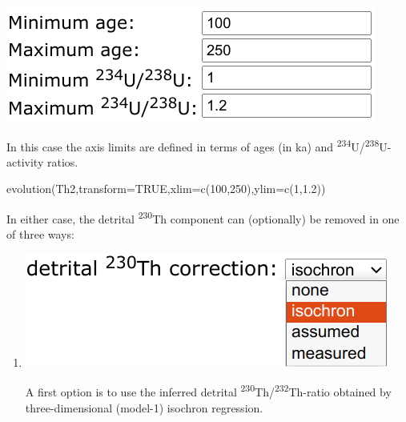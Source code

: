 \begin{refsection}
\begin{enumerate}
  \noindent\begin{minipage}[t]{.4\linewidth}
  \strut\vspace*{-\baselineskip}\newline
  \includegraphics[width=\linewidth]{../figures/ThUvsAgeLimits.png}
  \end{minipage}
  \begin{minipage}[t]{.6\linewidth}
    In this case the axis limits are defined in terms of ages (in ka)
    and \textsuperscript{234}U/\textsuperscript{238}U-activity ratios.
  \end{minipage}

\begin{console}
evolution(Th2,transform=TRUE,xlim=c(100,250),ylim=c(1,1.2))
\end{console}

  In either case, the detrital \textsuperscript{230}Th component can
  (optionally) be removed in one of three ways:

\begin{enumerate}
  \item \begin{minipage}[t]{.4\linewidth}
    \strut\vspace*{-\baselineskip}\newline
    \includegraphics[width=\linewidth]{../figures/ThUdetritalisochroncorr.png}
  \end{minipage}
    \begin{minipage}[t]{.6\linewidth}
      A first option is to use the inferred detrital
      \textsuperscript{230}Th/\textsuperscript{232}Th-ratio obtained
      by three-dimensional (model-1) isochron regression.
    \end{minipage}


\end{enumerate}
\end{enumerate}
\end{refsection}

